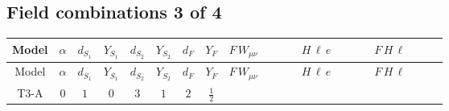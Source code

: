 \documentclass[8pt]{article}
\begin{document}
\begin{landscape}
\subsection*{Field combinations 3 of 4}
\begin{longtable}{@{}cccccccc >{\raggedright\arraybackslash}p{0.21\linewidth} >{\raggedright\arraybackslash}p{0.21\linewidth} >{\raggedright\arraybackslash}p{0.21\linewidth}@{}}
\toprule
Model & $\alpha$ & $d_{S_1}$ & $Y_{S_1}$ & $d_{S_2}$ & $Y_{S_2}$ & $d_F$ & $Y_F$ & $F\,W_{\mu\nu}$ & $H\,\ell\,e$ & $F\,H\,\ell$ \\
\midrule
\endfirsthead
\toprule
Model & $\alpha$ & $d_{S_1}$ & $Y_{S_1}$ & $d_{S_2}$ & $Y_{S_2}$ & $d_F$ & $Y_F$ & $F\,W_{\mu\nu}$ & $H\,\ell\,e$ & $F\,H\,\ell$ \\
\midrule
\endhead
T3-A & $0$ & $1$ & $0$ & $3$ & $1$ & $2$ & $\frac{1}{2}$ & \scriptsize\adjustbox{max width=\linewidth}{$\begin{gathered} -\frac{1}{2} \hbar  \log \left(\frac{\bar{\mu}^{2}}{M_F^2}\right) \left(W_{\mu _1\mu _2}^{A_1}\right){}^2\end{gathered}$} & \scriptsize\adjustbox{max width=\linewidth}{$\begin{gathered} +\frac{\hbar  \overline{y_{1,i_3,r_1}} \overline{L_{a_1,i_2}}\, P_R\, e_{i_1} H_{a_1} y_{1,i_2,r_1} Y_{e,i_3,i_1}}{4 \epsilon } \\ -\frac{1}{8} \hbar  \overline{y_{1,i_3,r_1}} \overline{L_{a_1,i_2}}\, P_R\, e_{i_1} H_{a_1} y_{1,i_2,r_1} Y_{e,i_3,i_1} \\ +\frac{\sqrt{3} \hbar  \overline{y_{2,i_3,r_1}} \overline{L_{a_1,i_2}}\, P_R\, e_{i_1} H_{a_1} y_{2,i_2,r_1} Y_{e,i_3,i_1}}{4 \epsilon }\end{gathered}$} & \scriptsize\adjustbox{max width=\linewidth}{$\begin{gathered} +\frac{2 \hbar  \log \left(\frac{M_F^2}{m_2^2}\right) \overline{y_{1,i_1,r_1}} \overline{y_{2,i_2,r_1}} L_{a_4,i_2}{}^T\, C\, P_L\, L_{a_2,i_1} H_{a_1} H_{a_3} m_2^2 \lambda_5 \epsilon_{a_1,a_2} \epsilon_{a_3,a_4} M_F^3}{\sqrt{3} \left(M_F^2-m_1^2\right) \left(M_F^2-m_2^2\right) \left(m_1^2-m_2^2\right)} \\ -\frac{2 \hbar  \log \left(\frac{M_F^2}{m_1^2}\right) \overline{y_{1,i_1,r_1}} \overline{y_{2,i_2,r_1}} L_{a_4,i_2}{}^T\, C\, P_L\, L_{a_2,i_1} H_{a_1} H_{a_3} m_1^2 \lambda_5 \epsilon_{a_1,a_2} \epsilon_{a_3,a_4} M_F^3}{\sqrt{3} \left(M_F^2-m_1^2\right) \left(M_F^2-m_2^2\right) \left(m_1^2-m_2^2\right)} \\ +\frac{2 \hbar  \log \left(\frac{M_F^2}{m_2^2}\right) \overline{\lambda_5} \overline{L_{a_3,i_1}}\, C\, P_R\, \overline{L_{a_4,i_2}}{}^T m_2^2 y_{1,i_1,r_1} y_{2,i_2,r_1} \epsilon_{a_1,a_3} \epsilon_{a_2,a_4} H_{a_1}{}^{\dagger } H_{a_2}{}^{\dagger } M_F^3}{\sqrt{3} \left(M_F^2-m_1^2\right) \left(M_F^2-m_2^2\right) \left(m_1^2-m_2^2\right)}\end{gathered}$} \\

\end{longtable}
\end{landscape}
\end{document}
